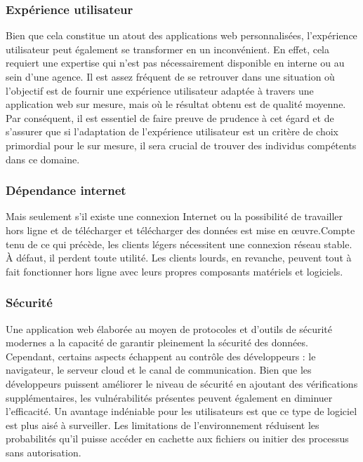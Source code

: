 \documentclass[a4paper, 12pt, french]{article}
\begin{document}
			\subsubsection{Expérience utilisateur}
				Bien que cela constitue un atout des applications web personnalisées, l'expérience utilisateur peut également se transformer en un inconvénient. En effet, cela requiert une expertise qui n'est pas nécessairement disponible en interne ou au sein d'une agence. Il est assez fréquent de se retrouver dans une situation où l'objectif est de fournir une expérience utilisateur adaptée à travers une application web sur mesure, mais où le résultat obtenu est de qualité moyenne. Par conséquent, il est essentiel de faire preuve de prudence à cet égard et de s'assurer que si l'adaptation de l'expérience utilisateur est un critère de choix primordial pour le sur mesure, il sera crucial de trouver des individus compétents dans ce domaine.
			
			\subsubsection{Dépendance internet}
				Mais seulement s'il existe une connexion Internet ou la possibilité de travailler hors ligne et de télécharger et télécharger des données est mise en œuvre.Compte tenu de ce qui précède, les clients légers nécessitent une connexion réseau stable. À défaut, il perdent toute utilité. Les clients lourds, en revanche, peuvent tout à fait fonctionner hors ligne avec leurs propres composants matériels et logiciels.
			
			\subsubsection{Sécurité}
				Une application web élaborée au moyen de protocoles et d'outils de sécurité modernes a la capacité de garantir pleinement la sécurité des données. Cependant, certains aspects échappent au contrôle des développeurs : le navigateur, le serveur cloud et le canal de communication. Bien que les développeurs puissent améliorer le niveau de sécurité en ajoutant des vérifications supplémentaires, les vulnérabilités présentes peuvent également en diminuer l'efficacité. Un avantage indéniable pour les utilisateurs est que ce type de logiciel est plus aisé à surveiller. Les limitations de l'environnement réduisent les probabilités qu'il puisse accéder en cachette aux fichiers ou initier des processus sans autorisation.
			
\end{document}
